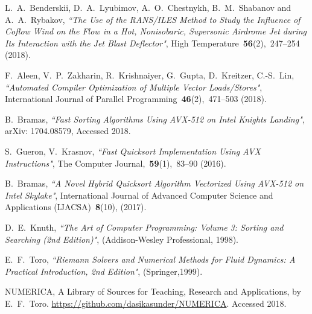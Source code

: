 \documentclass[
11pt,%
tightenlines,%
twoside,%
onecolumn,%
nofloats,%
nobibnotes,%
nofootinbib,%
superscriptaddress,%
noshowpacs,%
centertags]%
{revtex4}
\begin{document}
\begin{thebibliography}{99}
L.~A.~Benderskii, D.~A.~Lyubimov, A.~O.~Chestnykh, B.~M.~Shabanov and A.~A.~Rybakov, {\it ``The Use of the RANS/ILES Method to Study the Influence of Coflow Wind on the Flow in a Hot, Nonisobaric, Supersonic Airdrome Jet during Its Interaction with the Jet Blast Deflector"}, High Temperature~{\bf 56}(2),~247--254 (2018).

F.~Aleen, V.~P.~Zakharin, R.~Krishnaiyer, G.~Gupta, D.~Kreitzer, C.-S.~Lin, {\it ``Automated Compiler Optimization of Multiple Vector Loads/Stores"}, International Journal of Parallel Programming~{\bf 46}(2),~471--503 (2018).


B.~Bramas, {\it ``Fast Sorting Algorithms Using AVX-512 on Intel Knights Landing"}, arXiv: 1704.08579, Accessed 2018.

S.~Gueron, V.~Krasnov, {\it ``Fast Quicksort Implementation Using AVX Instructions"}, The Computer Journal,~{\bf 59}(1),~83--90 (2016).

B.~Bramas, {\it ``A Novel Hybrid Quicksort Algorithm Vectorized Using AVX-512 on Intel Skylake"}, International Journal of Advanced Computer Science and Applications (IJACSA)~{\bf 8}(10), (2017).

D.~E.~Knuth, {\it ``The Art of Computer Programming: Volume 3: Sorting and Searching (2nd Edition)"}, (Addison-Wesley Professional, 1998).


E.~F.~Toro, {\it ``Riemann Solvers and Numerical Methods for Fluid Dynamics:
A Practical Introduction, 2nd Edition"}, (Springer,1999).

NUMERICA, A Library of Sources for Teaching, Research and Applications, by E.~F.~Toro. \url{https://github.com/dasikasunder/NUMERICA}. Accessed 2018.

\end{thebibliography}
\end{document}
